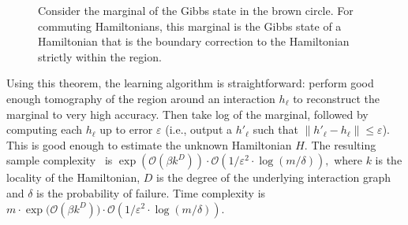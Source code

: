 \documentclass[11pt]{article}
\begin{document}
\begin{figure}
\centering
{}
\caption{Consider the marginal of the Gibbs state in the brown circle. For commuting Hamiltonians, this marginal is the Gibbs state of a Hamiltonian that is the boundary correction to the Hamiltonian strictly within the region.}
\label{fig:commeff}
\end{figure}

Using this theorem, the learning algorithm is straightforward: perform good enough tomography of the region around an interaction $h_\ell$ to reconstruct the marginal to very high accuracy. Then take log of the marginal, followed by computing each $h_\ell$ up to error $\varepsilon$ (i.e., output a $h'_\ell$ such that $\|h'_\ell-h_\ell\|\leq\varepsilon$). This is good enough to estimate the unknown Hamiltonian $H$. The resulting sample complexity~\cite{AAKScomm21} is
$\exp({\mathcal{O}(\beta k^D)})\cdot \mathcal{O}\left(1/{\varepsilon^2}\cdot \log (m/\delta)\right),
$
where $k$ is the locality of the Hamiltonian, $D$ is the degree of the underlying interaction graph and $\delta$ is the probability of failure. Time complexity is 
$m\cdot {\exp({\mathcal{O}(\beta k^D)}})\cdot \mathcal{O}\left(1/{\varepsilon^2}\cdot \log (m/\delta)\right)$.
\end{document}
